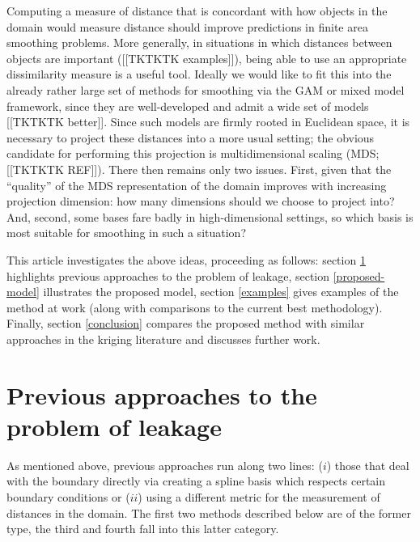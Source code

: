 \documentclass[useAMS, referee]{biom}
\begin{document}
Computing a measure of distance that is concordant with how objects in the domain would measure distance should improve predictions in finite area smoothing problems. More generally, in situations in which distances between objects are important ([[TKTKTK examples]]), being able to use an appropriate dissimilarity measure is a useful tool. Ideally we would like to fit this into the already rather large set of methods for smoothing via the GAM or mixed model framework, since they are well-developed and admit a wide set of models [[TKTKTK better]]. Since such models are firmly rooted in Euclidean space, it is necessary to project these distances into a more usual setting; the obvious candidate for performing this projection is multidimensional scaling (MDS; [[TKTKTK REF]]). There then remains only two issues. First, given that the ``quality'' of the MDS representation of the domain improves with increasing projection dimension: how many dimensions should we choose to project into? And, second, some bases fare badly in high-dimensional settings, so which basis is most suitable for smoothing in such a situation?

This article investigates the above ideas, proceeding as follows: section \ref{previous-approaches} highlights previous approaches to the problem of leakage, section \ref{proposed-model} illustrates the proposed model, section \ref{examples} gives examples of the method at work (along with comparisons to the current best methodology). Finally, section \ref{conclusion} compares the proposed method with similar approaches in the kriging literature and discusses further work.

\section{Previous approaches to the problem of leakage}
\label{previous-approaches}

As mentioned above, previous approaches run along two lines: ($i$) those that deal with the boundary directly via creating a spline basis which respects certain boundary conditions or ($ii$) using a different metric for the measurement of distances in the domain. The first two methods described below are of the former type, the third and fourth fall into this latter category.
\end{document}
